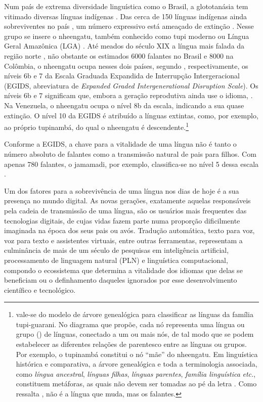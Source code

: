 \documentclass[portuguese]{textolivre}
\begin{document}
Num país de extrema diversidade linguística como o Brasil, a glototanásia tem vitimado diversas línguas indígenas \parencite{rodrigues1986linguas,Rodrigues-500-anos}. Das cerca de 150 línguas indígenas ainda sobreviventes no país \parencite{storto2019}, um número expressivo está ameaçado de extinção \parencite{eberhard-simons-fennig2023}. Nesse grupo se insere o nheengatu, também conhecido como tupi moderno ou Língua Geral Amazônica (LGA) \parencite{rodrigues1996,freire2011,rodrigues-cabral-2011,moore2014}. Até meados do século XIX a língua mais falada da região norte \parencite{navarro2016}, não obstante os estimados 6000 falantes no Brasil e 8000 na Colômbia, o nheengatu ocupa nesses dois países, segundo \textcite{eberhard-simons-fennig2023}, respectivamente, os níveis 6b e 7 da Escala Graduada Expandida de Interrupção Intergeracional (EGIDS, abreviatura de \textit{Expanded Graded Intergenerational Disruption Scale}). Os níveis 6b e 7 significam que, embora a geração reprodutiva ainda use o idioma,  \parencite{eberhard-simons-fennig2023}. Na Venezuela, o nheengatu ocupa o nível 8b da escala, indicando a sua quase extinção. O nível 10 da EGIDS é atribuído a línguas extintas, como, por exemplo, ao próprio tupinambá, do qual o nheengatu é descendente.\footnote{\label{footnote:descendente}\textcite{cruz2011} vale-se do modelo de árvore genealógica para classificar as línguas da família tupi-guarani. No diagrama que propõe, cada nó representa uma língua ou grupo () de línguas, conectado a um ou mais nós, de tal modo que se podem estabelecer as diferentes relações de parentesco entre as línguas ou grupos. Por exemplo, o tupinambá constitui o nó ``mãe'' do nheengatu. Em linguística histórica e comparativa, a árvore genealógica e toda a terminologia associada, como \textit{língua ancestral}, \textit{línguas filhas}, \textit{línguas parentes}, \textit{família linguística} 	\textit{etc.}, constituem  metáforas, as quais não devem ser tomadas ao pé da letra \parencite{AikhenvaldDixon2001}. Como ressalta \textcite{Faraco2022}, não é a língua que muda, mas os falantes.}

Conforme a EGIDS, a chave para a vitalidade de uma língua não é tanto o número absoluto de falantes como a transmissão natural de pais para filhos. Com apenas 780 falantes, o jamamadi, por exemplo, classifica-se no nível 5 dessa escala \parencite{eberhard-simons-fennig2023}.

Um dos fatores para a sobrevivência de uma língua nos dias de hoje é a sua presença no mundo digital. As novas gerações, exatamente aquelas responsáveis pela cadeia de transmissão de uma língua, são os usuários mais frequentes das tecnologias digitais, de cujas vidas fazem parte numa proporção dificilmente imaginada na época dos seus pais ou avós. Tradução automática, texto para voz, voz para texto e assistentes virtuais, entre outras ferramentas, representam a culminância de mais de um século de pesquisas em inteligência artificial, processamento de linguagem natural (PLN) e linguística computacional, compondo o ecossistema que determina a vitalidade dos idiomas que delas se beneficiam ou o definhamento daqueles ignorados por esse desenvolvimento científico e tecnológico.
\end{document}
